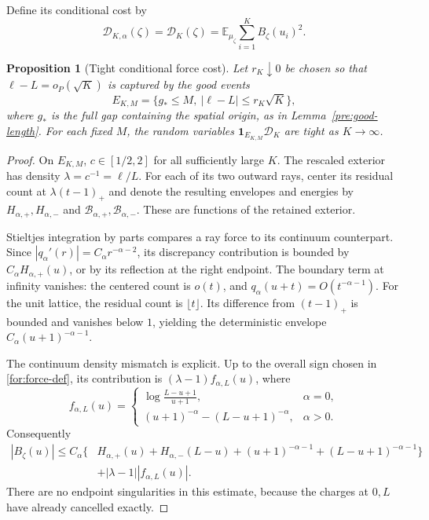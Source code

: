 \documentclass[11pt,reqno]{amsart}
\numberwithin{equation}{section}
\newtheorem{proposition}[theorem]{Proposition}
\theoremstyle{definition}
\newcommand{\E}{\mathbb E}
\newcommand{\1}{\mathbf 1}
\newcommand{\abs}[1]{\left|#1\right|}
\begin{document}
Define its conditional cost by
\begin{equation}\label{for:cost}
 \mathcal D_{K,\alpha}(\zeta)=\mathcal D_K(\zeta)
 =\E_{\mu_\zeta}\sum_{i=1}^K B_\zeta(u_i)^2.
\end{equation}

\begin{proposition}[Tight conditional force cost]\label{for:tight}
Let $r_K\downarrow0$ be chosen so that
$\ell-L=o_P(\sqrt K)$ is captured by the good events
\[
 E_{K,M}=\{g_*\le M,\ \abs{\ell-L}\le r_K\sqrt K\},
\]
where $g_*$ is the full gap containing the spatial origin, as in
Lemma~\ref{pre:good-length}.
For each fixed $M$, the random variables
$\1_{E_{K,M}}\mathcal D_K$ are tight as $K\to\infty$.
\end{proposition}

\begin{proof}
On $E_{K,M}$, $c\in[1/2,2]$ for all sufficiently large $K$.
The rescaled exterior has density $\lambda=c^{-1}=\ell/L$.
For each of its two outward rays, center its residual count at
$\lambda(t-1)_+$ and denote the resulting envelopes and energies
by $H_{\alpha,+},H_{\alpha,-}$ and
$\mathcal B_{\alpha,+},\mathcal B_{\alpha,-}$.
These are functions of the retained exterior.

Stieltjes integration by parts compares a ray force to its continuum
counterpart.  Since
$\abs{q_\alpha'(r)}=C_\alpha r^{-\alpha-2}$, its discrepancy
contribution is bounded by $C_\alpha H_{\alpha,+}(u)$, or by its
reflection at the right endpoint.  The boundary term at infinity
vanishes: the centered count is $o(t)$, and
$q_\alpha(u+t)=O(t^{-\alpha-1})$.  For the unit lattice, the residual
count is $\lfloor t\rfloor$.  Its difference from $(t-1)_+$ is
bounded and vanishes below $1$, yielding the deterministic envelope
$C_\alpha(u+1)^{-\alpha-1}$.

The continuum density mismatch is explicit.  Up to the overall sign
chosen in \eqref{for:force-def}, its contribution is
$(\lambda-1)f_{\alpha,L}(u)$, where
\[
 f_{\alpha,L}(u)=
 \begin{cases}
 \displaystyle\log\frac{L-u+1}{u+1},&\alpha=0,\\[6pt]
 (u+1)^{-\alpha}-(L-u+1)^{-\alpha},&\alpha>0.
 \end{cases}
\]
Consequently
\begin{equation}\label{for:pointwise}
 \begin{split}
 \abs{B_\zeta(u)}\le C_\alpha\bigl\{&
 H_{\alpha,+}(u)+H_{\alpha,-}(L-u)
 +(u+1)^{-\alpha-1}+(L-u+1)^{-\alpha-1}\bigr\}\\
 &+\abs{\lambda-1}\abs{f_{\alpha,L}(u)}.
 \end{split}
\end{equation}
There are no endpoint singularities in this estimate, because the
charges at $0,L$ have already cancelled exactly.


\end{proof}
\end{document}
